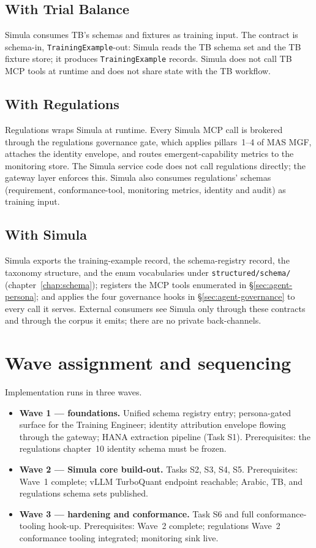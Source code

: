 \subsection{With Trial Balance}
Simula consumes TB's schemas and fixtures as training input. The
contract is schema-in, \texttt{TrainingExample}-out: Simula reads
the TB schema set and the TB fixture store; it produces
\texttt{TrainingExample} records. Simula does not call TB MCP tools
at runtime and does not share state with the TB workflow.

\subsection{With Regulations}
Regulations wraps Simula at runtime. Every Simula MCP call is
brokered through the regulations governance gate, which applies
pillars~1--4 of MAS MGF, attaches the identity envelope, and routes
emergent-capability metrics to the monitoring store. The Simula
service code does not call regulations directly; the gateway layer
enforces this. Simula also consumes regulations' schemas
(requirement, conformance-tool, monitoring metrics, identity and
audit) as training input.

\subsection{With Simula}
Simula exports the training-example record, the schema-registry
record, the taxonomy structure, and the enum vocabularies under
\texttt{structured/schema/} (chapter~\ref{chap:schema}); registers
the MCP tools enumerated in \S\ref{sec:agent-persona}; and applies
the four governance hooks in \S\ref{sec:agent-governance} to every
call it serves. External consumers see Simula only through these
contracts and through the corpus it emits; there are no private
back-channels.

\section{Wave assignment and sequencing}
\label{sec:agent-waves}
Implementation runs in three waves.

\begin{itemize}
  \item \textbf{Wave 1 --- foundations.} Unified schema registry
    entry; persona-gated surface for the Training Engineer;
    identity attribution envelope flowing through the gateway; HANA
    extraction pipeline (Task S1). Prerequisites: the regulations
    chapter~10 identity schema must be frozen.
  \item \textbf{Wave 2 --- Simula core build-out.} Tasks S2, S3, S4,
    S5. Prerequisites: Wave~1 complete; vLLM TurboQuant endpoint
    reachable; Arabic, TB, and regulations schema sets published.
  \item \textbf{Wave 3 --- hardening and conformance.} Task S6 and
    full conformance-tooling hook-up. Prerequisites: Wave~2
    complete; regulations Wave~2 conformance tooling integrated;
    monitoring sink live.
\end{itemize}

